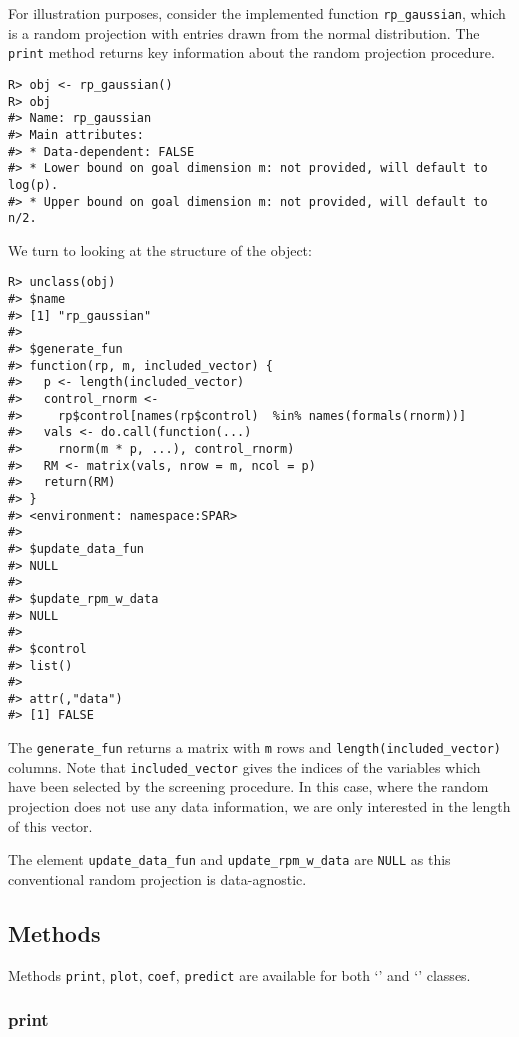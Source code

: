 \documentclass[
  article]{jss}
\newcommand{\class}[1]{`\code{#1}'}
\begin{document}
For illustration purposes, consider the implemented function
\texttt{rp\_gaussian}, which is a random projection with entries drawn
from the normal distribution. The \texttt{print} method returns key
information about the random projection procedure.

\begin{verbatim}
R> obj <- rp_gaussian()
R> obj
#> Name: rp_gaussian 
#> Main attributes: 
#> * Data-dependent: FALSE 
#> * Lower bound on goal dimension m: not provided, will default to log(p). 
#> * Upper bound on goal dimension m: not provided, will default to n/2.
\end{verbatim}

We turn to looking at the structure of the object:

\begin{verbatim}
R> unclass(obj)
#> $name
#> [1] "rp_gaussian"
#> 
#> $generate_fun
#> function(rp, m, included_vector) {
#>   p <- length(included_vector)
#>   control_rnorm <-
#>     rp$control[names(rp$control)  %in% names(formals(rnorm))]
#>   vals <- do.call(function(...)
#>     rnorm(m * p, ...), control_rnorm)
#>   RM <- matrix(vals, nrow = m, ncol = p)
#>   return(RM)
#> }
#> <environment: namespace:SPAR>
#> 
#> $update_data_fun
#> NULL
#> 
#> $update_rpm_w_data
#> NULL
#> 
#> $control
#> list()
#> 
#> attr(,"data")
#> [1] FALSE
\end{verbatim}

The \texttt{generate\_fun} returns a matrix with \texttt{m} rows and
\texttt{length(included\_vector)} columns. Note that
\texttt{included\_vector} gives the indices of the variables which have
been selected by the screening procedure. In this case, where the random
projection does not use any data information, we are only interested in
the length of this vector.

The element \texttt{update\_data\_fun} and \texttt{update\_rpm\_w\_data}
are \texttt{NULL} as this conventional random projection is
data-agnostic.

\subsection{Methods}\label{methods}

Methods \texttt{print}, \texttt{plot}, \texttt{coef}, \texttt{predict}
are available for both \class{spar} and \class{spar.cv} classes.

\subsubsection{print}\label{print}
\end{document}
